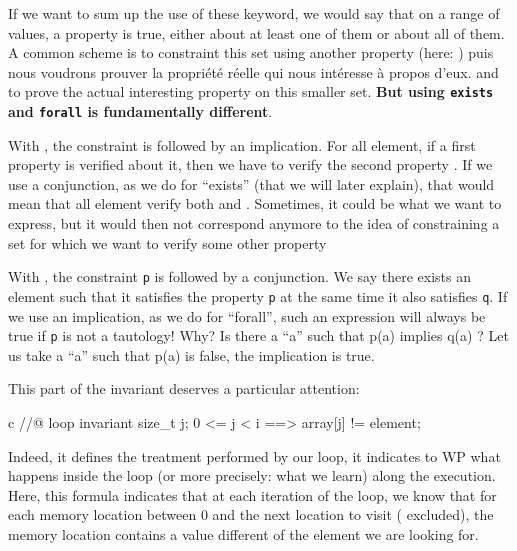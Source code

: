 If we want to sum up the use of these keyword, we would say that on a
range of values, a property is true, either about at least one of them
or about all of them. A common scheme is to constraint this set using
another property (here: ) puis nous voudrons prouver la
propriété réelle qui nous intéresse à propos d'eux.  and to prove the
actual interesting property on this smaller set. \textbf{But using
\texttt{exists} and \texttt{forall} is fundamentally different}.



With ,
the constraint  is followed by an implication. For all
element, if a first property  is verified about it, then we
have to verify the second property . If we use a conjunction,
as we do for ``exists'' (that we will later explain), that would mean
that all element verify both  and . Sometimes, it
could be what we want to express, but it would then not correspond
anymore to the idea of constraining a set for which we want to verify
some other property



With , the
constraint \texttt{p} is followed by a conjunction. We say there exists
an element such that it satisfies the property \texttt{p} at the same
time it also satisfies \texttt{q}. If we use an implication, as we do
for ``forall'', such an expression will always be true if \texttt{p} is
not a tautology! Why? Is there a ``a'' such that p(a) implies q(a) ? Let
us take a ``a'' such that p(a) is false, the implication is true.



This part of the invariant deserves a particular attention:



\begin{CodeBlock}{c}
//@ loop invariant \forall size_t j; 0 <= j < i ==> array[j] != element;
\end{CodeBlock}



Indeed, it defines the treatment performed by our loop, it indicates to
WP what happens inside the loop (or more precisely: what we learn) along
the execution. Here, this formula indicates that at each iteration of
the loop, we know that for each memory location between 0 and the next
location to visit ( excluded), the memory location contains a
value different of the element we are looking for.

